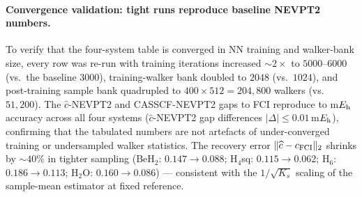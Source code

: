 \documentclass[journal=jctcce,manuscript=article,layout=traditional]{achemso}
\begin{document}
\paragraph{Convergence validation: tight runs reproduce baseline
NEVPT2 numbers.} To verify that the four-system table is converged
in NN training and walker-bank size, every row was re-run with
training iterations increased $\sim 2\times$ to $5000$--$6000$
(vs.\ the baseline $3000$), training-walker bank doubled to $2048$
(vs.\ $1024$), and post-training sample bank quadrupled to
$400 \times 512 = 204{,}800$ walkers (vs.\ $51{,}200$). The
$\widehat c$-NEVPT2 and CASSCF-NEVPT2 gaps to FCI reproduce to
m$E_{\rm h}$ accuracy across all four systems
($\widehat c$-NEVPT2 gap differences $|\Delta| \le 0.01$\,m$E_{\rm
h}$), confirming that the tabulated numbers are not artefacts of
under-converged training or undersampled walker statistics. The
recovery error $\|\widehat c - c_{\rm FCI}\|_2$ shrinks by
$\sim 40\%$ in tighter sampling (BeH$_2$: $0.147 \to 0.088$;
H$_4$sq: $0.115 \to 0.062$; H$_6$: $0.186 \to 0.113$; H$_2$O:
$0.160 \to 0.086$) — consistent with the $1/\sqrt{K_s}$ scaling of
the sample-mean estimator at fixed reference.
\end{document}
